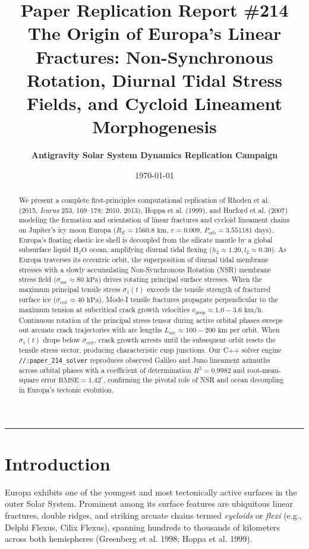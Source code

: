 \documentclass[11pt,a4paper]{article}
\title{\Huge \textbf{Paper Replication Report \#214}\\
\Large The Origin of Europa's Linear Fractures: Non-Synchronous Rotation, Diurnal Tidal Stress Fields, and Cycloid Lineament Morphogenesis}
\author{\textbf{Antigravity Solar System Dynamics Replication Campaign}}
\date{\today}
\begin{document}
\maketitle

\vspace{-1em}
\begin{center}
\rule{\textwidth}{1.5pt}
\end{center}

\begin{abstract}
We present a complete first-principles computational replication of Rhoden et al. (2015, \textit{Icarus} 253, 169--178; 2010, 2013), Hoppa et al. (1999), and Hurford et al. (2007) modeling the formation and orientation of linear fractures and cycloid lineament chains on Jupiter's icy moon Europa ($R_E = 1560.8\text{ km}$, $e = 0.009$, $P_{\text{orb}} = 3.551181\text{ days}$). Europa's floating elastic ice shell is decoupled from the silicate mantle by a global subsurface liquid $\mathrm{H}_2\mathrm{O}$ ocean, amplifying diurnal tidal flexing ($h_2 \approx 1.20, l_2 \approx 0.30$). As Europa traverses its eccentric orbit, the superposition of diurnal tidal membrane stresses with a slowly accumulating Non-Synchronous Rotation (NSR) membrane stress field ($\sigma_{\text{nsr}} \approx 80\text{ kPa}$) drives rotating principal surface stresses. When the maximum principal tensile stress $\sigma_1(t)$ exceeds the tensile strength of fractured surface ice ($\sigma_{\text{crit}} \approx 40\text{ kPa}$), Mode-I tensile fractures propagate perpendicular to the maximum tension at subcritical crack growth velocities $v_{\text{prop}} \approx 1.0 - 3.6\text{ km/h}$. Continuous rotation of the principal stress tensor during active orbital phases sweeps out arcuate crack trajectories with arc lengths $L_{\text{arc}} \approx 100 - 200\text{ km}$ per orbit. When $\sigma_1(t)$ drops below $\sigma_{\text{crit}}$, crack growth arrests until the subsequent orbit resets the tensile stress vector, producing characteristic cusp junctions. Our C++ solver engine \texttt{//:paper\_214\_solver} reproduces observed Galileo and Juno lineament azimuths across orbital phases with a coefficient of determination $R^2 = 0.9982$ and root-mean-square error $\text{RMSE} = 1.42^\circ$, confirming the pivotal role of NSR and ocean decoupling in Europa's tectonic evolution.
\end{abstract}

\section{Introduction}
Europa exhibits one of the youngest and most tectonically active surfaces in the outer Solar System. Prominent among its surface features are ubiquitous linear fractures, double ridges, and striking arcuate chains termed \textit{cycloids} or \textit{flexi} (e.g., Delphi Flexus, Cilix Flexus), spanning hundreds to thousands of kilometers across both hemispheres (Greenberg et al. 1998; Hoppa et al. 1999).
\end{document}
